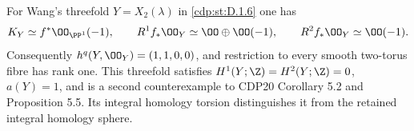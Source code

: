 


\begin{proposition}\hypertarget{tag-01FY}{}\label{cdp:st:D.1.13}



For Wang's threefold $Y=X_2(\lambda)$ in \ref{cdp:st:D.1.6} one has
\[
K_Y\simeq f^*\OO_{\PP^1}(-1),\qquad
R^1f_*\OO_Y\simeq\OO\oplus\OO(-1),\qquad
R^2f_*\OO_Y\simeq\OO(-1).
\]
Consequently $h^q(Y,\OO_Y)=(1,1,0,0)$, and restriction to every
smooth two-torus fibre has rank one. This threefold satisfies
$H^1(Y;\Z)=H^2(Y;\Z)=0$, $a(Y)=1$, and is a second
counterexample to CDP20 Corollary 5.2 and Proposition 5.5.
Its integral homology torsion distinguishes it from the retained
integral homology sphere.
\end{proposition}

